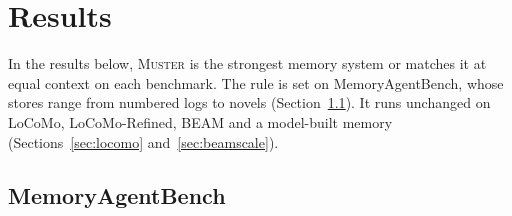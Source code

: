 \documentclass{article}
\newcommand{\sys}{\textsc{Muster}}
\begin{document}
\section{Results}\label{sec:results}

In the results below, \sys{} is the strongest memory system or matches it at equal context on each benchmark. The rule is set on MemoryAgentBench, whose stores range from numbered logs to novels (Section~\ref{sec:mabres}). It runs unchanged on LoCoMo, LoCoMo-Refined, BEAM and a model-built memory (Sections~\ref{sec:locomo} and~\ref{sec:beamscale}).

\subsection{MemoryAgentBench}\label{sec:mabres}
\end{document}
